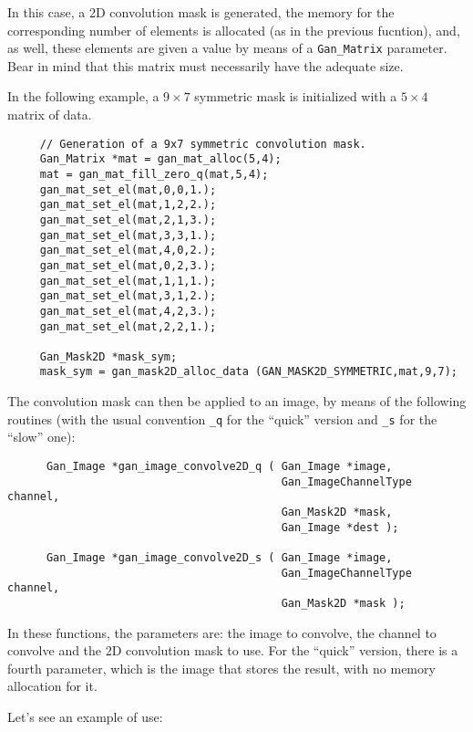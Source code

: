    In this case, a 2D convolution mask is generated, the memory for the 
    corresponding number of elements is allocated (as in the previous
    fucntion), and, as well, these elements are given a value by means of 
    a \texttt{Gan\_Matrix} parameter. Bear in mind that this matrix
    must necessarily have the adequate size.

    In the following example, a $9 \times 7$ symmetric mask is initialized
    with a $5 \times 4$ matrix of data.

    \begin{verbatim}
     // Generation of a 9x7 symmetric convolution mask.
     Gan_Matrix *mat = gan_mat_alloc(5,4);
     mat = gan_mat_fill_zero_q(mat,5,4);
     gan_mat_set_el(mat,0,0,1.);
     gan_mat_set_el(mat,1,2,2.);
     gan_mat_set_el(mat,2,1,3.);
     gan_mat_set_el(mat,3,3,1.);
     gan_mat_set_el(mat,4,0,2.);
     gan_mat_set_el(mat,0,2,3.);
     gan_mat_set_el(mat,1,1,1.);
     gan_mat_set_el(mat,3,1,2.);
     gan_mat_set_el(mat,4,2,3.);
     gan_mat_set_el(mat,2,2,1.);

     Gan_Mask2D *mask_sym;
     mask_sym = gan_mask2D_alloc_data (GAN_MASK2D_SYMMETRIC,mat,9,7);
    \end{verbatim}

 
    The convolution mask can then be applied to an image, by means of the 
    following routines (with the usual convention \texttt{\_q} for 
    the ``quick'' version and \texttt{\_s} for the ``slow'' one):

    \begin{verbatim}
      Gan_Image *gan_image_convolve2D_q ( Gan_Image *image,
                                          Gan_ImageChannelType channel,
                                          Gan_Mask2D *mask, 
                                          Gan_Image *dest );

      Gan_Image *gan_image_convolve2D_s ( Gan_Image *image,
                                          Gan_ImageChannelType channel,
                                          Gan_Mask2D *mask );
    \end{verbatim}

    In these functions, the parameters are: the image to convolve,
    the channel to convolve and the 2D convolution mask to use. For the
    ``quick'' version, there is a fourth parameter, which is the
    image that stores the result, with no memory allocation for it. 
    
    Let's see an example of use:

